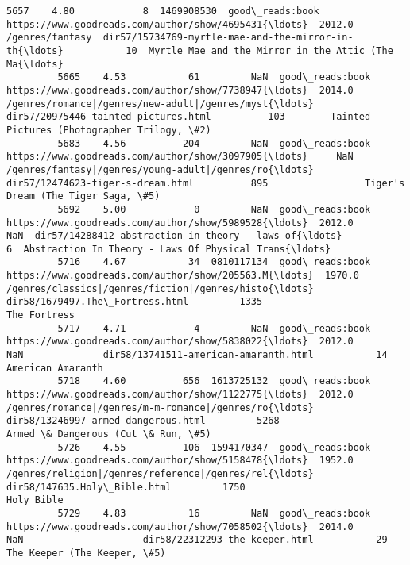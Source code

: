 \documentclass[11pt]{article}
\begin{document}
\begin{Verbatim}[commandchars=\\\{\}]
         5657    4.80            8  1469908530  good\_reads:book  https://www.goodreads.com/author/show/4695431{\ldots}  2012.0                                    /genres/fantasy  dir57/15734769-myrtle-mae-and-the-mirror-in-th{\ldots}           10  Myrtle Mae and the Mirror in the Attic (The Ma{\ldots}
         5665    4.53           61         NaN  good\_reads:book  https://www.goodreads.com/author/show/7738947{\ldots}  2014.0  /genres/romance|/genres/new-adult|/genres/myst{\ldots}               dir57/20975446-tainted-pictures.html          103        Tainted Pictures (Photographer Trilogy, \#2)
         5683    4.56          204         NaN  good\_reads:book  https://www.goodreads.com/author/show/3097905{\ldots}     NaN  /genres/fantasy|/genres/young-adult|/genres/ro{\ldots}                  dir57/12474623-tiger-s-dream.html          895                 Tiger's Dream (The Tiger Saga, \#5)
         5692    5.00            0         NaN  good\_reads:book  https://www.goodreads.com/author/show/5989528{\ldots}  2012.0                                                NaN  dir57/14288412-abstraction-in-theory---laws-of{\ldots}            6  Abstraction In Theory - Laws Of Physical Trans{\ldots}
         5716    4.67           34  0810117134  good\_reads:book  https://www.goodreads.com/author/show/205563.M{\ldots}  1970.0  /genres/classics|/genres/fiction|/genres/histo{\ldots}                    dir58/1679497.The\_Fortress.html         1335                                       The Fortress
         5717    4.71            4         NaN  good\_reads:book  https://www.goodreads.com/author/show/5838022{\ldots}  2012.0                                                NaN              dir58/13741511-american-amaranth.html           14                                  American Amaranth
         5718    4.60          656  1613725132  good\_reads:book  https://www.goodreads.com/author/show/1122775{\ldots}  2012.0  /genres/romance|/genres/m-m-romance|/genres/ro{\ldots}                dir58/13246997-armed-dangerous.html         5268                  Armed \& Dangerous (Cut \& Run, \#5)
         5726    4.55          106  1594170347  good\_reads:book  https://www.goodreads.com/author/show/5158478{\ldots}  1952.0  /genres/religion|/genres/reference|/genres/rel{\ldots}                       dir58/147635.Holy\_Bible.html         1750                                         Holy Bible
         5729    4.83           16         NaN  good\_reads:book  https://www.goodreads.com/author/show/7058502{\ldots}  2014.0                                                NaN                     dir58/22312293-the-keeper.html           29                        The Keeper (The Keeper, \#5)

\end{Verbatim}
\end{document}
